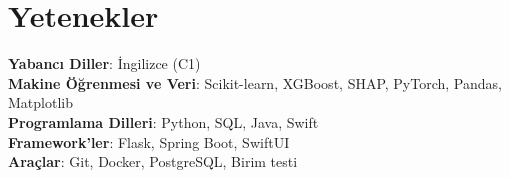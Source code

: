 \section{Yetenekler}
    \begin{itemize}[leftmargin=0.15in, label={}]
	\small{\item{
		\textbf{Yabancı Diller}{: İngilizce (C1)} \\
        \textbf{Makine Öğrenmesi ve Veri}{: Scikit-learn, XGBoost, SHAP, PyTorch, Pandas, Matplotlib} \\
        \textbf{Programlama Dilleri}{: Python, SQL, Java, Swift} \\
        \textbf{Framework'ler}{: Flask, Spring Boot, SwiftUI} \\
        \textbf{Araçlar}{: Git, Docker, PostgreSQL, Birim testi} \\
	}}
    \end{itemize}
